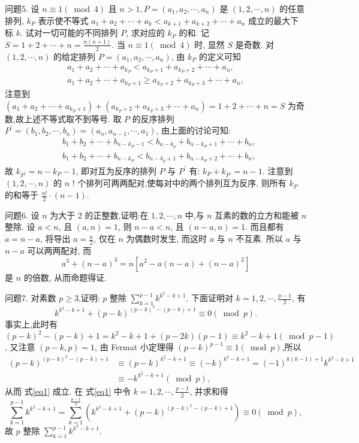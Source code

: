 问题5. 设 $n \equiv 1(\bmod 4)$ 且 $n>1, P=\left(a_1, a_2, \cdots, a_n\right)$ 是 $(1,2, \cdots, n)$ 的任意排列, $k_P$ 表示使不等式 $a_1+a_2+\cdots+a_k<a_{k+1}+a_{k+2}+\cdots+a_n$ 成立的最大下标 $k$. 试对一切可能的不同排列 $P$, 求对应的 $k_P$ 的和.
记 $S=1+2+\cdots+n=\frac{n(n+1)}{2}$. 当 $n \equiv 1(\bmod 4)$ 时, 显然 $S$ 是奇数.
对 $(1,2, \cdots, n)$ 的给定排列 $P=\left(a_1, a_2, \cdots, a_n\right)$, 由 $k_P$ 的定义可知
$$
\begin{gathered}
a_1+a_2+\cdots+a_{k_P}<a_{k_P+1}+a_{k_P+2}+\cdots+a_n, \\
a_1+a_2+\cdots+a_{k_P+1} \geqslant a_{k_P+2}+a_{k_P+3}+\cdots+a_n,
\end{gathered}
$$
注意到 $\left(a_1+a_2+\cdots+a_{k_P+1}\right)+\left(a_{k_P+2}+a_{k_P+3}+\cdots+a_n\right)=1+2+\cdots+n= S$ 为奇数,故上述不等式取不到等号.
取 $P$ 的反序排列 $P^{\prime}=\left(b_1, b_2, \cdots, b_n\right)=\left(a_n, a_{n-1}, \cdots, a_1\right)$, 由上面的讨论可知:
$$
\begin{aligned}
& b_1+b_2+\cdots+b_{n-k_P-1}<b_{n-k_p}+b_{n-k_P+1}+\cdots+b_n, \\
& b_1+b_2+\cdots+b_{n-k_P}<b_{n-k_p+1}+b_{n-k_P+2}+\cdots+b_n,
\end{aligned}
$$
故 $k_{P^{\prime}}=n-k_P-1$, 即对互为反序的排列 $P$ 与 $P^{\prime}$ 有: $k_P+k_{P^{\prime}}=n-1$.
注意到 $(1,2, \cdots, n)$ 的 $n$ ! 个排列可两两配对,使每对中的两个排列互为反序, 则所有 $k_P$ 的和等于 $\frac{n !}{2} \cdot(n-1)$.



问题6. 设 $n$ 为大于 2 的正整数,证明:在 $1,2, \cdots, n$ 中,与 $n$ 互素的数的立方和能被 $n$ 整除.
设 $a<n$, 且 $(a, n)=1$, 则 $n-a<n$, 且 $(n-a, n)=1$. 而且都有 $a= n-a$, 将导出 $a=\frac{n}{2}$, 仅在 $n$ 为偶数时发生, 而这时 $a$ 与 $n$ 不互素.
所以 $a$ 与 $n-a$ 可以两两配对, 而
$$
a^3+(n-a)^3=n\left[a^2-a(n-a)+(n-a)^2\right]
$$
是 $n$ 的倍数, 从而命题得证.



问题7. 对素数 $p \geqslant 3$,证明: $p$ 整除 $\sum_{k=1}^{p-1} k^{k^2-k+1}$.
下面证明对 $k=1,2, \cdots, \frac{p-1}{2}$, 有
$$
k^{k^2-k+1}+(p-k)^{(p-k)^2-(p-k)+1} \equiv 0(\bmod p) . \label{eq1}
$$
事实上,此时有
$(p-k)^2-(p-k)+1=k^2-k+1+(p-2 k)(p-1) \equiv k^2-k+1(\bmod p-1)$, 又注意 $(p-k, p)=1$, 由 Fermat 小定理得 $(p-k)^{p-1} \equiv 1(\bmod p)$,所以
$$
\begin{aligned}
(p-k)^{(p-k)^2-(p-k)+1} & \equiv(p-k)^{k^2-k+1} \equiv(-k)^{k^2-k+1}=(-1)^{k(k-1)+1} k^{k^2-k+1} \\
& \equiv-k^{k^2-k+1}(\bmod p),
\end{aligned}
$$
从而 式\ref{eq1} 成立.
在 式\ref{eq1} 中令 $k=1,2, \cdots, \frac{p-1}{2}$, 并求和得
$$
\sum_{k=1}^{p-1} k^{k^2-k+1}=\sum_{k=1}^{\frac{p-1}{2}}\left(k^{k^2-k+1}+(p-k)^{(p-k)^2-(p-k)+1}\right) \equiv 0(\bmod p),
$$
故 $p$ 整除 $\sum_{k=1}^{p-1} k^{k^2-k+1}$.



